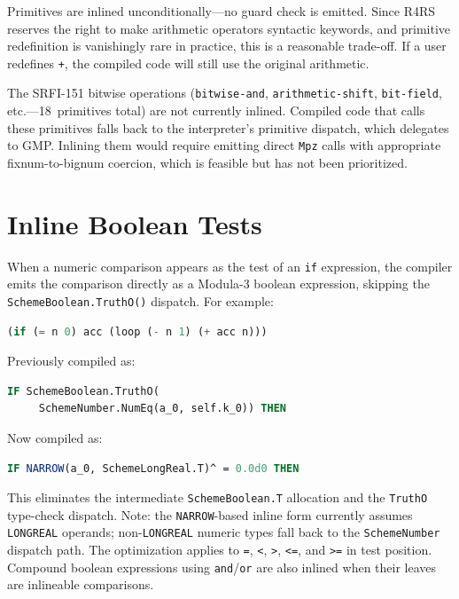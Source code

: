 \documentclass[12pt]{report}
\begin{document}
Primitives are inlined unconditionally---no guard check is emitted.
Since R4RS reserves the right to make arithmetic operators
syntactic keywords, and primitive redefinition is vanishingly
rare in practice, this is a reasonable trade-off.  If a user
redefines \texttt{+}, the compiled code will still use the
original arithmetic.

The SRFI-151 bitwise operations (\texttt{bitwise-and},
\texttt{arithmetic-shift}, \texttt{bit-field}, etc.---18~primitives
total) are not currently inlined.  Compiled code that calls these
primitives falls back to the interpreter's primitive dispatch, which
delegates to GMP.  Inlining them would require emitting direct
\texttt{Mpz} calls with appropriate fixnum-to-bignum coercion,
which is feasible but has not been prioritized.

\section{Inline Boolean Tests}
\label{sec:opt-booltest}

When a numeric comparison appears as the test of an \texttt{if}
expression, the compiler emits the comparison directly as a
Modula-3 boolean expression, skipping the \texttt{SchemeBoolean.TruthO()}
dispatch.  For example:

\begin{lstlisting}[language=Scheme]
(if (= n 0) acc (loop (- n 1) (+ acc n)))
\end{lstlisting}

\noindent
Previously compiled as:

\begin{lstlisting}[language=Modula3]
IF SchemeBoolean.TruthO(
     SchemeNumber.NumEq(a_0, self.k_0)) THEN
\end{lstlisting}

\noindent
Now compiled as:

\begin{lstlisting}[language=Modula3]
IF NARROW(a_0, SchemeLongReal.T)^ = 0.0d0 THEN
\end{lstlisting}

\noindent
This eliminates the intermediate \texttt{SchemeBoolean.T} allocation
and the \texttt{TruthO} type-check dispatch.
Note: the \texttt{NARROW}-based inline form currently assumes
\texttt{LONGREAL} operands; non-\texttt{LONGREAL} numeric types
fall back to the \texttt{SchemeNumber} dispatch path.  The optimization
applies to \texttt{=}, \texttt{<}, \texttt{>}, \texttt{<=}, and
\texttt{>=} in test position.  Compound boolean expressions using
\texttt{and}/\texttt{or} are also inlined when their leaves are
inlineable comparisons.
\end{document}
